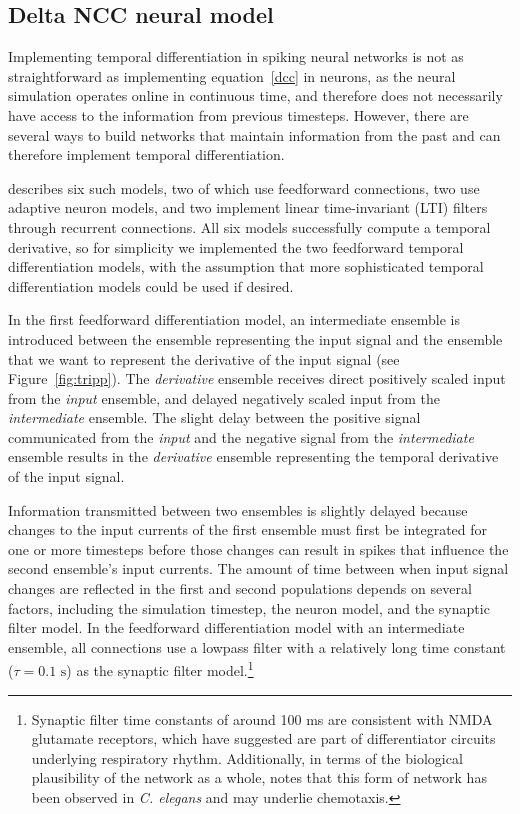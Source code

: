 \subsection{Delta NCC neural model}
\label{sec:impl-deriv}

Implementing temporal differentiation
in spiking neural networks
is not as straightforward as implementing
equation~\eqref{dcc} in neurons,
as the neural simulation operates
online in continuous time,
and therefore does not necessarily
have access to the information
from previous timesteps.
However, there are several ways
to build networks that maintain
information from the past
and can therefore implement temporal differentiation.

\cite{tripp2010} describes six such models,
two of which use feedforward connections,
two use adaptive neuron models,
and two implement linear time-invariant (LTI) filters
through recurrent connections.
All six models successfully
compute a temporal derivative,
so for simplicity we implemented
the two feedforward temporal differentiation models,
with the assumption that
more sophisticated temporal differentiation
models could be used if desired.


In the first feedforward differentiation model,
an intermediate ensemble is introduced
between the ensemble representing the input signal
and the ensemble that we want to represent
the derivative of the input signal
(see Figure~\ref{fig:tripp}).
The \textit{derivative} ensemble
receives direct positively scaled input from
the \textit{input} ensemble,
and delayed negatively scaled input from
the \textit{intermediate} ensemble.
The slight delay between the positive signal
communicated from the \textit{input}
and the negative signal
from the \textit{intermediate} ensemble
results in the \textit{derivative} ensemble
representing the temporal derivative
of the input signal.

Information transmitted between two ensembles
is slightly delayed
because changes to the input currents
of the first ensemble
must first be integrated for one or more
timesteps before those changes can result in
spikes that influence
the second ensemble's input currents.
The amount of time between
when input signal changes are reflected
in the first and second populations
depends on several factors,
including the simulation timestep,
the neuron model, and the synaptic filter model.
In the feedforward differentiation model
with an intermediate ensemble,
all connections use a lowpass filter
with a relatively long time constant
($\tau=0.1 \text{ s}$)
as the synaptic filter model.\footnote{
  Synaptic filter time constants of around 100 ms
  are consistent with NMDA glutamate receptors,
  which \cite{young2003} have suggested
  are part of differentiator circuits
  underlying respiratory rhythm.
  Additionally, in terms of
  the biological plausibility of the network as a whole,
  \cite{trip2010} notes that this form of network
  has been observed in \textit{C. elegans}
  \cite{dunn2004} and may underlie chemotaxis.}

